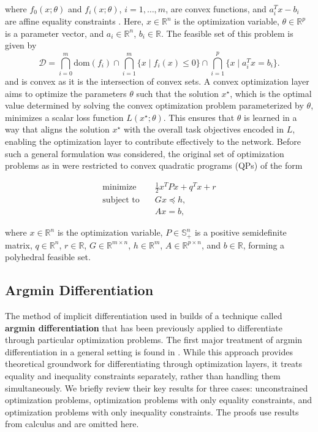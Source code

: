 \documentclass{article}
\begin{document}
where $f_0(x; \theta)$ and $f_i(x; \theta)$, $i = 1, \ldots, m$, are convex functions, and $a_i^T x - b_i$ are affine equality constraints \citep{boyd2004convex}. Here, $x \in \mathbb{R}^n$ is the optimization variable, $\theta \in \mathbb{R}^p$ is a parameter vector, and $a_i \in \mathbb{R}^n$, $b_i \in \mathbb{R}$. The feasible set of this problem is given by \[\mathcal{D} = \bigcap_{i=0}^m \text{dom}(f_i) \cap \bigcap_{i=1}^m \{x \mid f_i(x) \leq 0\} \cap \bigcap_{i=1}^p \{x \mid a_i^T x = b_i\}.
\] and is convex as it is the intersection of convex sets. A convex optimization layer aims to optimize the parameters \(\theta\) such that the solution \(x^\star\), which is the optimal value determined by solving the convex optimization problem parameterized by \(\theta\), minimizes a scalar loss function \(L(x^\star; \theta)\). This ensures that \(\theta\) is learned in a way that aligns the solution \(x^\star\) with the overall task objectives encoded in \(L\), enabling the optimization layer to contribute effectively to the network. Before such a general formulation was considered, the original set of optimization problems as in \citep{optnet} were restricted to convex quadratic programs (QPs) of the form

\begin{equation}
\begin{aligned}
    \text{minimize} \quad & \frac{1}{2} x^T P x + q^T x + r \\
    \text{subject to} \quad & Gx \preceq h, \\
                             & Ax = b,
\end{aligned}
\end{equation}

where \(x \in \mathbb{R}^n\) is the optimization variable, \(P \in \mathbb{S}_+^n\) is a positive semidefinite matrix, \(q \in \mathbb{R}^n\), \(r \in \mathbb{R}\), \(G \in \mathbb{R}^{m \times n}\), \(h \in \mathbb{R}^m\), \(A \in \mathbb{R}^{p \times n}\), and \(b \in \mathbb{R}\), forming a polyhedral feasible set. 

\subsection{Argmin Differentiation}

The method of implicit differentiation used in \citep{optnet} builds of a technique called \textbf{argmin differentiation} that has been previously applied to differentiate through particular optimization problems. The first major treatment of argmin differentiation in a general setting is found in \citep{gould2016differentiating}. While this approach provides theoretical groundwork for differentiating through optimization layers, it treats equality and inequality constraints separately, rather than handling them simultaneously. We briefly review their key results for three cases: unconstrained optimization problems, optimization problems with only equality constraints, and optimization problems with only inequality constraints. The proofs use results from calculus and are omitted here. 
\end{document}
